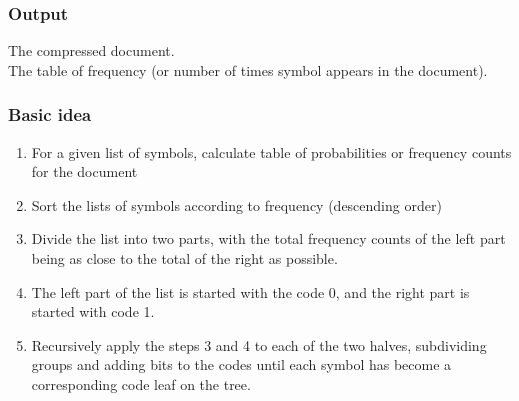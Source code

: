 \subsubsection*{Output}
The compressed document.\\
The table of frequency (or number of times symbol appears in the document).
\subsubsection*{Basic idea}
\begin{enumerate}
\item For a given list of symbols, calculate table of probabilities or frequency counts for the document
\item Sort the lists of symbols according to frequency (descending order)
\item Divide the list into two parts, with the total frequency counts of the left part being as close to the total of the right as possible.
\item The left part of the list is started with the code 0, and the right part is started with code 1. 
\item Recursively apply the steps 3 and 4 to each of the two halves, subdividing groups and adding bits to the codes until each symbol has become a corresponding code leaf on the tree.
\end{enumerate}
\pagebreak

